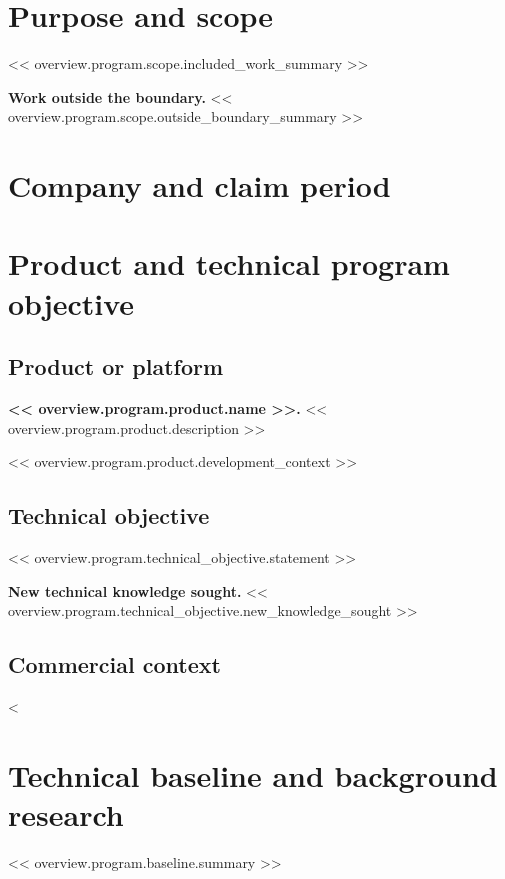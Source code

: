 \documentclass[11pt]{article}
\begin{document}
\RDTitlePage
\tableofcontents
\clearpage

\section{Purpose and scope}
<< overview.program.scope.included_work_summary >>

\textbf{Work outside the boundary.} << overview.program.scope.outside_boundary_summary >>

\section{Company and claim period}
\RDMetaTable

\section{Product and technical program objective}
\subsection{Product or platform}
\textbf{<< overview.program.product.name >>.} << overview.program.product.description >>

<< overview.program.product.development_context >>

\subsection{Technical objective}
<< overview.program.technical_objective.statement >>

\textbf{New technical knowledge sought.} << overview.program.technical_objective.new_knowledge_sought >>

\subsection{Commercial context}
<%

\section{Technical baseline and background research}
<< overview.program.baseline.summary >>
\end{document}
